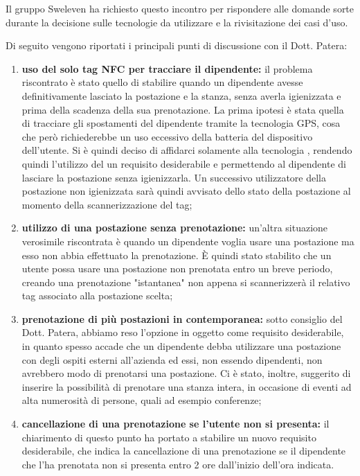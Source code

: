 Il gruppo Sweleven ha richiesto questo incontro per rispondere alle domande sorte durante la decisione sulle tecnologie da utilizzare e la rivisitazione dei casi d'uso.

Di seguito vengono riportati i principali punti di discussione con il Dott. Patera:
\begin{enumerate}
    \item \textbf{uso del solo tag NFC per tracciare il dipendente:} il problema riscontrato è stato quello di stabilire quando un dipendente avesse definitivamente lasciato la postazione e la stanza, senza averla igienizzata e prima della scadenza della sua prenotazione. La prima ipotesi è stata quella di tracciare gli spostamenti del dipendente tramite la tecnologia GPS, cosa che però richiederebbe un uso eccessivo della batteria del dispositivo dell'utente. Si è quindi deciso di affidarci solamente alla tecnologia , rendendo quindi l'utilizzo del  un requisito desiderabile e permettendo al dipendente di lasciare la postazione senza igienizzarla. Un successivo utilizzatore della postazione non igienizzata sarà quindi avvisato dello stato della postazione al momento della scannerizzazione del tag;
    \item \textbf{utilizzo di una postazione senza prenotazione:} un'altra situazione verosimile riscontrata è quando un dipendente voglia usare una postazione ma esso non abbia effettuato la prenotazione. È quindi stato stabilito che un utente possa usare una postazione non prenotata entro un breve periodo, creando una prenotazione "istantanea" non appena si scannerizzerà il relativo tag associato alla postazione scelta;
    \item \textbf{prenotazione di più postazioni in contemporanea:} sotto consiglio del Dott. Patera, abbiamo reso l'opzione in oggetto come requisito desiderabile, in quanto spesso accade che un dipendente debba utilizzare una postazione con degli ospiti esterni all'azienda ed essi, non essendo dipendenti, non avrebbero modo di prenotarsi una postazione. Ci è stato, inoltre, suggerito di inserire la possibilità di prenotare una stanza intera, in occasione di eventi ad alta numerosità di persone, quali ad esempio conferenze;
    \item \textbf{cancellazione di una prenotazione se l'utente non si presenta:} il chiarimento di questo punto ha portato a stabilire un nuovo requisito desiderabile, che indica la cancellazione di una prenotazione se il dipendente che l'ha prenotata non si presenta entro 2 ore dall'inizio dell'ora indicata.
 \end{enumerate}